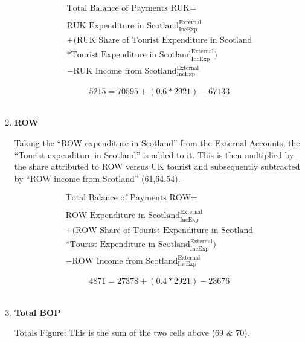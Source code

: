 \begin{enumerate}
\begin{equation}
\begin{split}
\text{Total Balance of Payments RUK} =  \\ \\
\text{RUK Expenditure in Scotland}^\text{External}_\text{IncExp}\\
+(\text{RUK Share of Tourist Expenditure in Scotland}\\
*\text{Tourist  Expenditure in Scotland}^\text{External}_\text{IncExp})\\
-\text{RUK Income from Scotland}^\text{External}_\text{IncExp}
\end{split} \label{eq:2.5.73}
\end{equation}

\begin{equation} \nonumber
5215 = 70595+(0.6*2921)-67133
\end{equation}\\


\item \textbf {ROW}

Taking the “ROW expenditure in Scotland” from the External Accounts, the “Tourist expenditure in Scotland” is added to it. This is then multiplied by the share attributed to ROW versus UK tourist and subsequently subtracted by “ROW income from Scotland” (61,64,54). \cite{ONS2010a}

\begin{equation}
\begin{split}
\text{Total Balance of Payments ROW} =  \\ \\
\text{ROW Expenditure in Scotland}^\text{External}_\text{IncExp}\\
+(\text{ROW Share of Tourist Expenditure in Scotland}\\
*\text{Tourist  Expenditure in Scotland}^\text{External}_\text{IncExp})\\
-\text{ROW Income from Scotland}^\text{External}_\text{IncExp}
\end{split} \label{eq:2.5.74}
\end{equation}

\begin{equation} \nonumber
4871 = 27378+(0.4*2921)-23676
\end{equation}\\


\item \textbf {Total BOP}

Totals Figure: This is the sum of the two cells above (69 \& 70).


\end{enumerate}
